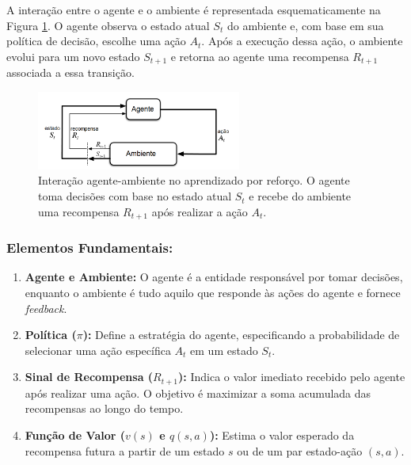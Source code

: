A interação entre o agente e o ambiente é representada esquematicamente na Figura \ref{fig:agent_env_interaction}. O agente observa o estado atual \( S_t \) do ambiente e, com base em sua política de decisão, escolhe uma ação \( A_t \). Após a execução dessa ação, o ambiente evolui para um novo estado \( S_{t+1} \) e retorna ao agente uma recompensa \( R_{t+1} \) associada a essa transição.

\begin{figure}[h]
    \centering
    \includegraphics[width=0.6\textwidth]{fig/MDP.png}
    \caption{Interação agente-ambiente no aprendizado por reforço. O agente toma decisões com base no estado atual \( S_t \) e recebe do ambiente uma recompensa \( R_{t+1} \) após realizar a ação \( A_t \).}
    \label{fig:agent_env_interaction}
\end{figure}

\subsubsection*{Elementos Fundamentais:}
\begin{enumerate}
    \item \textbf{Agente e Ambiente:} O agente é a entidade responsável por tomar decisões, enquanto o ambiente é tudo aquilo que responde às ações do agente e fornece \textit{feedback}.
    \item \textbf{Política (\(\pi\)):} Define a estratégia do agente, especificando a probabilidade de selecionar uma ação específica \( A_t \) em um estado \( S_t \).
    \item \textbf{Sinal de Recompensa (\(R_{t+1}\)):} Indica o valor imediato recebido pelo agente após realizar uma ação. O objetivo é maximizar a soma acumulada das recompensas ao longo do tempo.
    \item \textbf{Função de Valor (\(v(s)\) e \(q(s, a)\)):} Estima o valor esperado da recompensa futura a partir de um estado \( s \) ou de um par estado-ação \( (s, a) \).
\end{enumerate}

